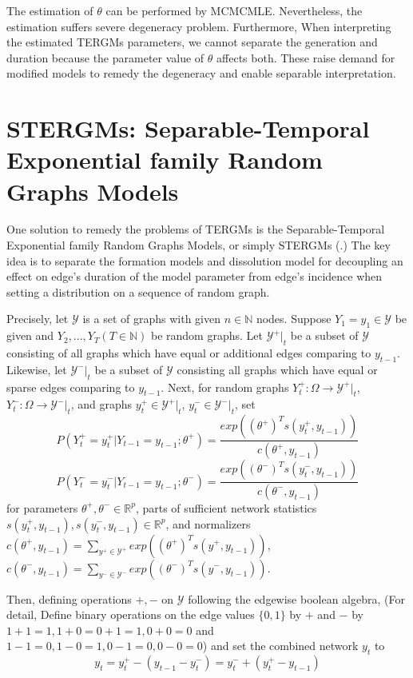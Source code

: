 \documentclass[a4paper, 11pt]{report}
\theoremstyle{definition}
\begin{document}
The estimation of $\theta$ can be performed by MCMCMLE.
Nevertheless, the estimation suffers severe degeneracy problem.
Furthermore, When interpreting the estimated TERGMs parameters,
we cannot separate the generation and duration because
the parameter value of $\theta$ affects both.
These raise demand for modified models to remedy the degeneracy and enable separable interpretation.

\section{STERGMs: Separable-Temporal Exponential family Random Graphs Models}
One solution to remedy the problems of TERGMs is 
the Separable-Temporal Exponential family Random Graphs Models, or simply STERGMs (\cite{RN93}.)
The key idea is to separate the formation models and dissolution model
for decoupling an effect on edge's duration of the model parameter from edge's incidence
when setting a distribution on a sequence of random graph.

Precisely,
let $\mathcal{Y}$ is a set of graphs with given $n\in\mathbb{N}$ nodes. 
Suppose $Y_1=y_1 \in \mathcal{Y}$ be given and $Y_2,...,Y_T (T\in\mathbb{N})$ be random graphs.
Let $\mathcal{Y}^+|_t$ be a subset of $\mathcal{Y}$ consisting of all graphs which have equal or additional edges comparing to $y_{t-1}$.
Likewise, let $\mathcal{Y}^-|_t$ be a subset of $\mathcal{Y}$ consisting all graphs which have equal or sparse edges comparing to $y_{t-1}$.
Next, for random graphs $Y_t^+: \Omega \to\mathcal{Y}^+|_t$, $Y_t^-: \Omega \to\mathcal{Y}^-|_t$,
and graphs $y_t^+ \in \mathcal{Y}^+|_t$, $y_t^- \in \mathcal{Y}^-|_t$, set
\[P(Y_t^+=y_t^+|Y_{t-1}=y_{t-1};\theta^+) = \frac{exp((\theta^+)^{T}s(y_t^+, y_{t-1}))}{c(\theta^+, y_{t-1})}\]
\[P(Y_t^-=y_t^-|Y_{t-1}=y_{t-1};\theta^-) = \frac{exp((\theta^-)^{T}s(y_t^-, y_{t-1}))}{c(\theta^-, y_{t-1})}\]
for parameters $\theta^+,\theta^-\in\mathbb{R}^p$, parts of sufficient network statistics $s(y_t^+, y_{t-1}), s(y_t^-, y_{t-1})\in\mathbb{R}^p$,
and normalizers $c(\theta^+, y_{t-1})=\sum_{y^+\in\mathcal{Y}^+}exp((\theta^+)^{T}s(y^+, y_{t-1}))$, 
$c(\theta^-, y_{t-1})=\sum_{y^-\in\mathcal{Y}^-}exp((\theta^-)^{T}s(y^-, y_{t-1}))$.

Then, defining operations $+,-$ on $\mathcal{Y}$ following the edgewise boolean algebra,
(For detail, Define binary operations on the edge values $\{0,1\}$ by $+$ and $-$ 
by $1+1=1, 1+0=0+1=1, 0+0=0$ and $1-1=0, 1-0=1, 0-1=0, 0-0=0$) 
and set the combined network $y_t$ to
\[y_t=y_t^+ - (y_{t-1} - y_t^-) = y_t^- + (y_t^+ - y_{t-1})\]
\end{document}
